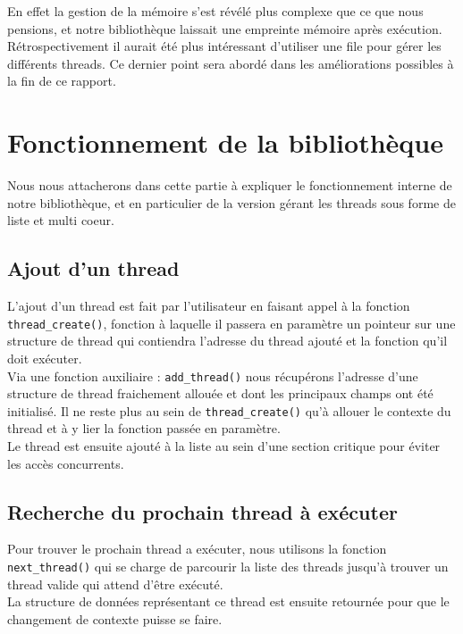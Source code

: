 \documentclass{article}
\begin{document}
			En effet la gestion de la mémoire s'est révélé plus
            complexe que ce que nous pensions, et notre bibliothèque
            laissait une empreinte mémoire après exécution.
            Rétrospectivement il aurait été plus intéressant
            d'utiliser une file pour gérer les différents threads. Ce
            dernier point sera abordé dans les améliorations possibles
            à la fin de ce rapport.
			

	\section{Fonctionnement de la bibliothèque}
	Nous nous attacherons dans cette partie à expliquer le
    fonctionnement interne de notre bibliothèque, et en particulier
     de la version gérant les threads sous forme de
    liste et multi coeur.

		\subsection{Ajout d'un thread}
		L'ajout d'un thread est fait par l'utilisateur en faisant 
		appel à la fonction \verb!thread_create()!, fonction à laquelle il
		passera en paramètre un pointeur sur une structure de thread qui 
		contiendra l'adresse du thread ajouté et la fonction qu'il doit
		exécuter.\\
		
		Via une fonction auxiliaire : \verb!add_thread()! nous récupérons
		l'adresse d'une structure de thread fraichement allouée et dont les
		principaux champs ont été initialisé. Il ne reste plus au sein de 
		\verb!thread_create()! qu'à allouer le contexte du thread et à y lier
		la fonction passée en paramètre.\\
		
		Le thread est ensuite ajouté à la liste au sein d'une section critique
		pour éviter les accès concurrents.

		\subsection{Recherche du prochain thread à exécuter}
		Pour trouver le prochain thread a exécuter, nous utilisons la 
		fonction \verb!next_thread()! qui se charge de parcourir la liste des
		threads jusqu'à trouver un thread valide qui attend d'être exécuté.\\
		
		La structure de données représentant ce thread est ensuite retournée
		pour que le changement de contexte puisse se faire.
		
\end{document}
